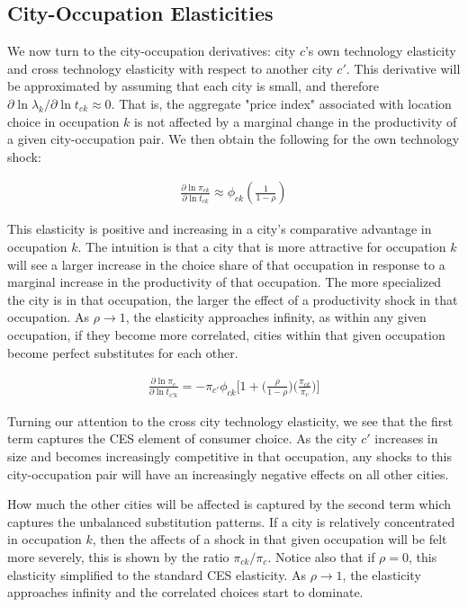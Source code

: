 \documentclass[10pt]{article}
\begin{document}
\subsection{City-Occupation Elasticities}

We now turn to the city-occupation derivatives: city $c$'s own technology elasticity and cross technology elasticity with respect to another city $c'$. This derivative will be approximated by assuming that each city is small, and therefore $\partial \ln \lambda_k / \partial \ln t_{ck} \approx 0$. That is, the aggregate "price index" associated with location choice in occupation $k$ is not affected by a marginal change in the productivity of a given city-occupation pair. We then obtain the following for the own technology shock:

\begin{align}
    \frac{\partial \ln \pi_{ck}}{\partial \ln t_{ck}} \approx \phi_{ck} \left( \frac{1}{1 - \rho} \right)
    \label{co_own_elasticity}
\end{align}

This elasticity is positive and increasing in a city's comparative advantage in occupation $k$. The intuition is that a city that is more attractive for occupation $k$ will see a larger increase in the choice share of that occupation in response to a marginal increase in the productivity of that occupation. The more specialized the city is in that occupation, the larger the effect of a productivity shock in that occupation. As $\rho \rightarrow 1$, the elasticity approaches infinity, as within any given occupation, if they become more correlated, cities within that given occupation become perfect substitutes for each other.

\begin{align}
    \frac{\partial\ln{\pi_{c}}}{\partial\ln{t_{{c'}k}}} = -{\pi_{c'}}{\phi_{ck}}\Big[1+\Big(\frac{\rho}{1-\rho}\Big)\Big(\frac{\pi_{ck}}{\pi_{c}}\Big)\Big]
    \label{co_cross_elasticity}
\end{align}

Turning our attention to the cross city technology elasticity, we see that the first term captures the CES element of consumer choice. As the city $c'$ increases in size and becomes increasingly competitive in that occupation, any shocks to this city-occupation pair will have an increasingly negative effects on all other cities.

How much the other cities will be affected is captured by the second term which captures the unbalanced substitution patterns. If a city is relatively concentrated in occupation $k$, then the affects of a shock in that given occupation will be felt more severely, this is shown by the ratio $\pi_{ck} / \pi_c$. Notice also that if $\rho = 0$, this elasticity simplified to the standard CES elasticity. As $\rho \rightarrow 1$, the elasticity approaches infinity and the correlated choices start to dominate.
\end{document}
